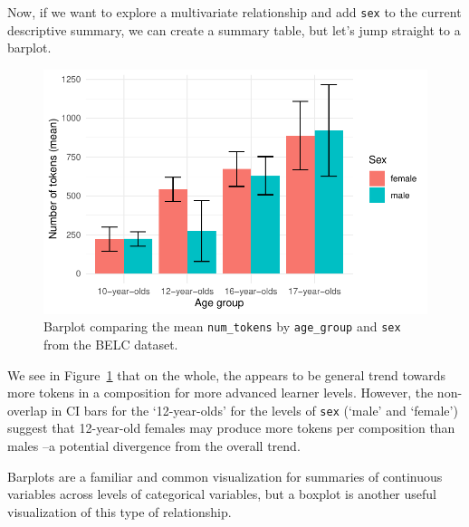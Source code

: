 \documentclass[
  letterpaper,
]{scrbook}
\begin{document}
Now, if we want to explore a multivariate relationship and add
\texttt{sex} to the current descriptive summary, we can create a summary
table, but let's jump straight to a barplot.

\begin{figure}[h]

{\centering \includegraphics{./approaching-analysis_files/figure-pdf/fig-summaries-multivariate-barplot-belc-1.pdf}

}

\caption{\label{fig-summaries-multivariate-barplot-belc}Barplot
comparing the mean \texttt{num\_tokens} by \texttt{age\_group} and
\texttt{sex} from the BELC dataset.}

\end{figure}

We see in Figure~\ref{fig-summaries-multivariate-barplot-belc} that on
the whole, the appears to be general trend towards more tokens in a
composition for more advanced learner levels. However, the non-overlap
in CI bars for the `12-year-olds' for the levels of \texttt{sex} (`male'
and `female') suggest that 12-year-old females may produce more tokens
per composition than males --a potential divergence from the overall
trend.

Barplots are a familiar and common visualization for summaries of
continuous variables across levels of categorical variables, but a
boxplot is another useful visualization of this type of relationship.
\end{document}

